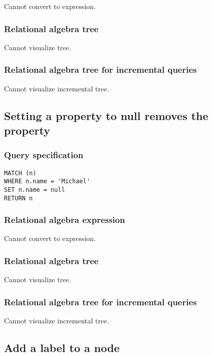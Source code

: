 Cannot convert to expression.

\subsubsection*{Relational algebra tree}

Cannot visualize tree.

\subsubsection*{Relational algebra tree for incremental queries}

Cannot visualize incremental tree.

\subsection{Setting a property to null removes the property}

\subsubsection*{Query specification}

\begin{lstlisting}
MATCH (n)
WHERE n.name = 'Michael'
SET n.name = null
RETURN n
\end{lstlisting}

\subsubsection*{Relational algebra expression}

Cannot convert to expression.

\subsubsection*{Relational algebra tree}

Cannot visualize tree.

\subsubsection*{Relational algebra tree for incremental queries}

Cannot visualize incremental tree.

\subsection{Add a label to a node}

